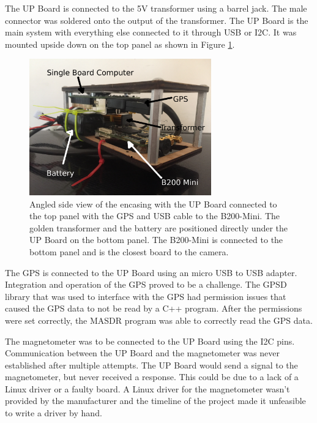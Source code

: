 The UP Board is connected to the 5V transformer using a barrel jack. The male connector was soldered onto the output of the transformer. The UP Board is the main system with everything else connected to it through USB or I2C. It was mounted upside down on the top panel as shown in Figure \ref{fig:box_usb_view}.
\begin{figure}[ht!]
	\centering
	\includegraphics[width=0.70\textwidth]{img/box_usb_view_labeled.JPG}
	\caption{Angled side view of the encasing with the UP Board connected to the top panel with the GPS and USB cable to the B200-Mini. The golden transformer and the battery are positioned directly under the UP Board on the bottom panel. The B200-Mini is connected to the bottom panel and is the closest board to the camera.}
	\label{fig:box_usb_view}
\end{figure}\par
The GPS is connected to the UP Board using an micro USB to USB adapter. Integration and operation of the GPS proved to be a challenge. The GPSD library that was used to interface with the GPS had permission issues that caused the GPS data to not be read by a C++ program. After the permissions were set correctly, the MASDR program was able to correctly read the GPS data.\par

The magnetometer was to be connected to the UP Board using the I2C pins. Communication between the UP Board and the magnetometer was never established after multiple attempts. The UP Board would send a signal to the magnetometer, but never received a response. This could be due to a lack of a Linux driver or a faulty board. A Linux driver for the magnetometer wasn't provided by the manufacturer and the timeline of the project made it unfeasible to write a driver by hand.\par

